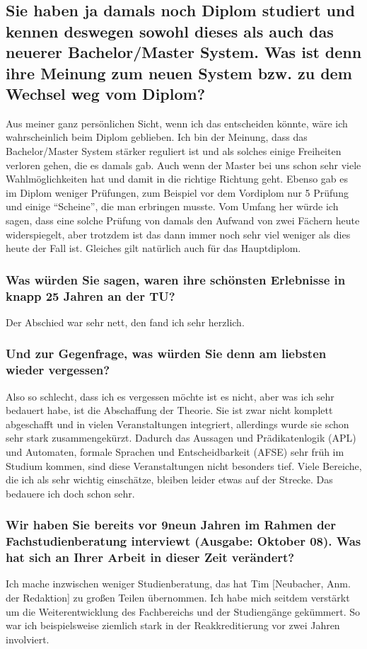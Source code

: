 {    \subsection*{Sie haben ja damals noch Diplom studiert und kennen deswegen sowohl dieses als auch das neuerer Bachelor/Master System. Was ist denn ihre Meinung zum neuen System bzw. zu dem Wechsel weg vom Diplom?}
    Aus meiner ganz persönlichen Sicht, wenn ich das entscheiden könnte, wäre ich wahrscheinlich beim Diplom geblieben. Ich bin der Meinung, dass das Bachelor/Master System stärker reguliert ist und als solches einige Freiheiten verloren gehen, die es damals gab. Auch wenn der Master bei uns schon sehr viele Wahlmöglichkeiten hat und damit in die richtige Richtung geht. Ebenso gab es im Diplom weniger Prüfungen, zum Beispiel vor dem Vordiplom nur 5 Prüfung und einige "`Scheine"', die man erbringen musste. Vom Umfang her würde ich sagen, dass eine solche Prüfung von damals den Aufwand von zwei Fächern heute widerspiegelt, aber trotzdem ist das dann immer noch sehr viel weniger als dies heute der Fall ist. Gleiches gilt natürlich auch für das Hauptdiplom.
    \subsubsection*{Was würden Sie sagen, waren ihre schönsten Erlebnisse in knapp 25 Jahren an der TU?}
    Der Abschied war sehr nett, den fand ich sehr herzlich.
    \subsubsection*{Und zur Gegenfrage, was würden Sie denn am liebsten wieder vergessen?}
    Also so schlecht, dass ich es vergessen möchte ist es nicht, aber was ich sehr bedauert habe, ist die Abschaffung der Theorie. Sie ist zwar nicht komplett abgeschafft und in vielen Veranstaltungen integriert, allerdings wurde sie schon sehr stark zusammengekürzt. Dadurch das Aussagen und Prädikatenlogik (APL) und Automaten, formale Sprachen und Entscheidbarkeit (AFSE) sehr früh im Studium kommen, sind diese Veranstaltungen nicht besonders tief. Viele Bereiche, die ich als sehr wichtig einschätze, bleiben leider etwas auf der Strecke. Das bedauere ich doch schon sehr.
    \subsubsection*{Wir haben Sie bereits vor 9neun Jahren im Rahmen der Fachstudienberatung interviewt (Ausgabe: Oktober 08). Was hat sich an Ihrer Arbeit in dieser Zeit verändert?}
    Ich mache inzwischen weniger Studienberatung, das hat Tim [Neubacher, Anm. der Redaktion] zu großen Teilen übernommen. Ich habe mich seitdem verstärkt um die Weiterentwicklung des Fachbereichs und der Studiengänge gekümmert. So war ich beispielsweise ziemlich stark in der Reakkreditierung vor zwei Jahren involviert.
}
